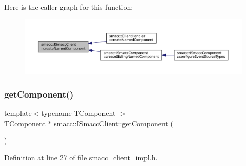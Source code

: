 Here is the caller graph for this function\+:
\nopagebreak
\begin{figure}[H]
\begin{center}
\leavevmode
\includegraphics[width=350pt]{classsmacc_1_1ISmaccClient_affcc2f95bc993b5f07ef0d6ab6eec8f1_icgraph}
\end{center}
\end{figure}
\mbox{\label{classsmacc_1_1ISmaccClient_adef78db601749ca63c19e74a27cb88cc}} 
\subsubsection{\texorpdfstring{get\+Component()}{getComponent()}\hspace{0.1cm}{\footnotesize\ttfamily [1/2]}}
{\footnotesize\ttfamily template$<$typename T\+Component $>$ \\
T\+Component $\ast$ smacc\+::\+I\+Smacc\+Client\+::get\+Component (\begin{DoxyParamCaption}{ }\end{DoxyParamCaption})}



Definition at line 27 of file smacc\+\_\+client\+\_\+impl.\+h.



